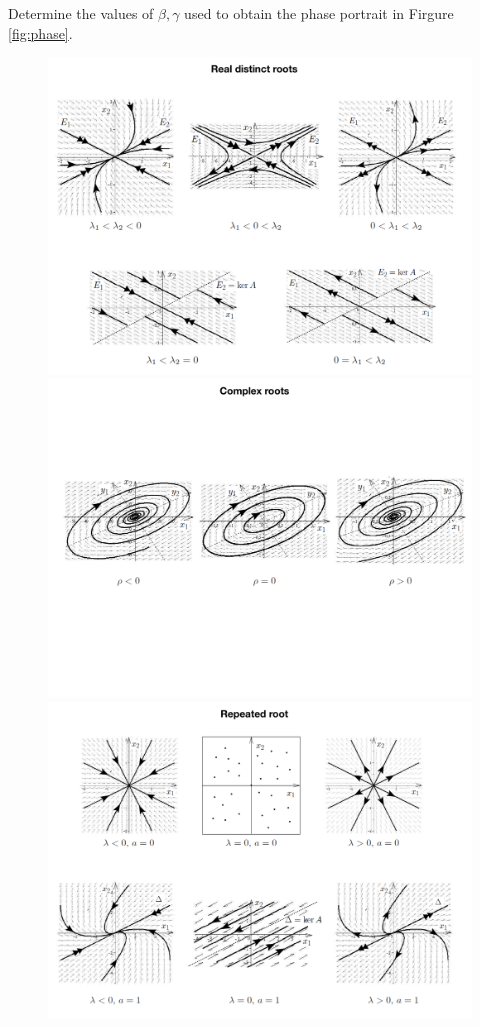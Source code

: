   \begin{Exercise}
  Determine the values of $\beta, \gamma$ used to obtain the phase portrait in Firgure \ref{fig:phase}.
  \dotfill

\dotfill

\dotfill

\dotfill

\dotfill

\dotfill

\dotfill

\dotfill

\dotfill

\dotfill
 \end{Exercise}
 \begin{figure}[H]
  \centering
  \includegraphics[width=0.7\linewidth]{img/root1.pdf}\\
    \includegraphics[width=0.7\linewidth]{img/root2.pdf}\\
      \includegraphics[width=0.7\linewidth]{img/root3.pdf}

\end{figure}
